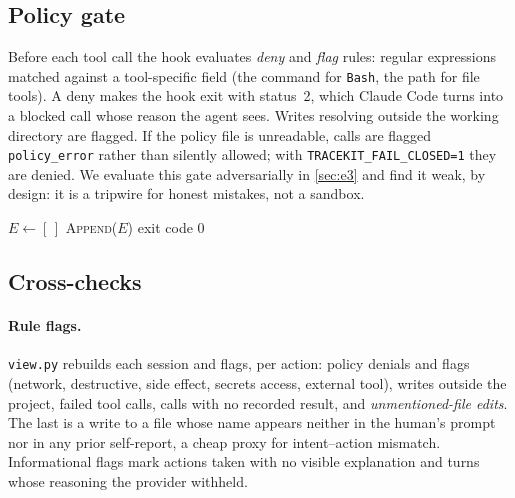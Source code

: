 \documentclass[11pt]{article}
\begin{document}
\subsection{Policy gate}
Before each tool call the hook evaluates \emph{deny} and \emph{flag} rules: regular expressions matched against a tool-specific field (the command for \texttt{Bash}, the path for file tools). A deny makes the hook exit with status~2, which Claude Code turns into a blocked call whose reason the agent sees. Writes resolving outside the working directory are flagged. If the policy file is unreadable, calls are flagged \texttt{policy\_error} rather than silently allowed; with \texttt{TRACEKIT\_FAIL\_CLOSED=1} they are denied. We evaluate this gate adversarially in \cref{sec:e3} and find it weak, by design: it is a tripwire for honest mistakes, not a sandbox.

\begin{algorithm}[t]
\caption{\texttt{hook.py} on one lifecycle event}\label{alg:hook}
\small
{}
$E \leftarrow [\,]$\;
\textsc{Append}($E$) 
\Return exit code 0 
\end{algorithm}

\subsection{Cross-checks}\label{sec:crosschecks}
\paragraph{Rule flags.} \texttt{view.py} rebuilds each session and flags, per action: policy denials and flags (network, destructive, side effect, secrets access, external tool), writes outside the project, failed tool calls, calls with no recorded result, and \emph{unmentioned-file edits}. The last is a write to a file whose name appears neither in the human's prompt nor in any prior self-report, a cheap proxy for intent--action mismatch. Informational flags mark actions taken with no visible explanation and turns whose reasoning the provider withheld.
\end{document}
